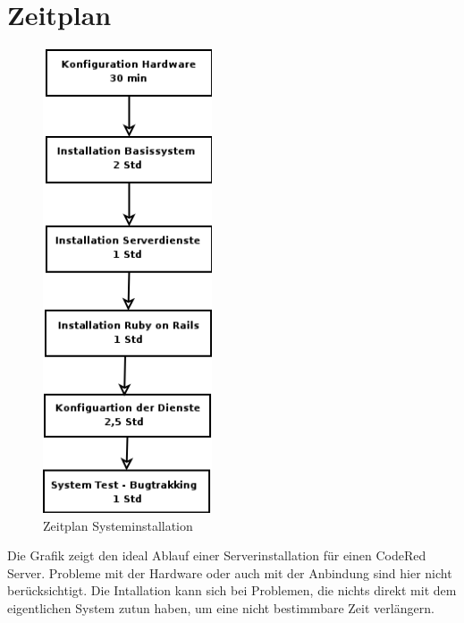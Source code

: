 \chapter{Zeitplan}  %
\label{chapter:Zeitplan}  %
\begin{figure}[h]
\begin{center}
   \includegraphics[width=5cm]{../bilder/Zeitplaninstall.png}
   \caption{Zeitplan Systeminstallation}
   \label{Zeitplan-Ablauf}
\end{center}
\end{figure}

Die Grafik zeigt den ideal Ablauf einer Serverinstallation für einen CodeRed Server. Probleme mit der Hardware oder auch mit der Anbindung sind hier nicht berücksichtigt. Die Intallation kann sich bei Problemen, die nichts direkt mit dem eigentlichen System zutun haben, um eine nicht bestimmbare Zeit verlängern.


